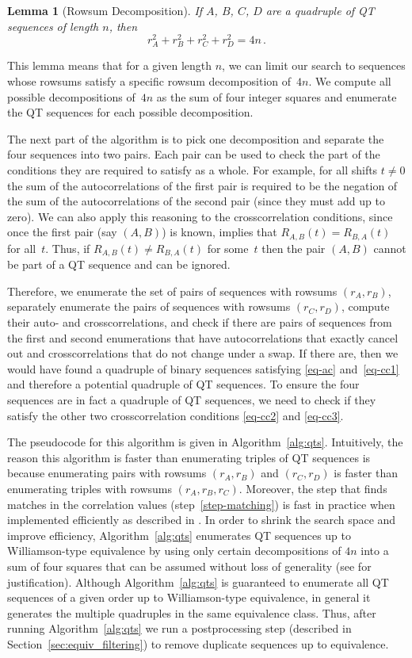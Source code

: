 \documentclass[12pt]{article}
\numberwithin{equation}{section}
\newtheorem{lemma}[theorem]{Lemma}
\begin{document}
\begin{lemma}[Rowsum Decomposition]
If $A$, $B$, $C$, $D$ are a quadruple of QT sequences of length $n$, then
\[ r_A^2 + r_B^2+r_C^2+r_D^2 = 4n \, . \]
\end{lemma}

This lemma means that for a given length $n$, we can limit our search to sequences whose rowsums satisfy
a specific rowsum decomposition of~$4n$.
We compute all possible decompositions of~$4n$ as the sum of
four integer squares and enumerate the QT sequences for each possible decomposition.

The next part of the algorithm is to pick one decomposition and separate the four sequences into two pairs.
Each pair can be used to check the part of the conditions they are required to satisfy as a whole.
For example, for all shifts $t\neq0$ the sum of the autocorrelations of the first pair is required to be the negation of the sum of the autocorrelations of the second pair (since they must add up to zero).
We can also apply this reasoning to the crosscorrelation conditions,
since once the first pair (say $(A,B)$) is known,  implies
that $R_{A,B}(t)=R_{B,A}(t)$ for all~$t$.  Thus, if $R_{A,B}(t)\neq R_{B,A}(t)$ for some~$t$
then the pair $(A,B)$ cannot be part of a QT sequence and can be ignored.

Therefore, we enumerate the set of pairs of sequences
with rowsums $(r_A,r_B)$, separately enumerate the pairs of sequences with rowsums $(r_C,r_D)$, compute their auto- and crosscorrelations,
and check if there are pairs of sequences from the first and second enumerations that
have autocorrelations that exactly cancel out and crosscorrelations that do not change under a swap.
If there are, then we would have found a quadruple of binary sequences satisfying
\eqref{eq-ac} and~\eqref{eq-cc1} and therefore a potential quadruple of QT sequences.
To ensure the four sequences are in fact a quadruple of QT sequences, we need to check if they satisfy the other two crosscorrelation conditions
\eqref{eq-cc2} and \eqref{eq-cc3}.

The pseudocode for this algorithm is given in Algorithm~\ref{alg:qts}.  Intuitively,
the reason this algorithm is faster than enumerating triples of QT sequences
is because enumerating pairs with rowsums $(r_A,r_B)$ and $(r_C,r_D)$ is faster than
enumerating triples with rowsums $(r_A,r_B,r_C)$.  Moreover,
the step that finds matches in the correlation values (step~\ref{step-matching}) is fast in practice
when implemented efficiently as described in .
In order to shrink the search space and improve efficiency,
Algorithm~\ref{alg:qts} enumerates QT sequences up to Williamson-type equivalence
by using only certain decompositions of $4n$ into a sum of four squares that
can be assumed without loss of generality (see  for justification).
Although Algorithm~\ref{alg:qts} is guaranteed to enumerate
all QT sequences of a given order up to Williamson-type equivalence, in general it generates the
multiple quadruples in the same equivalence class.  Thus, after running Algorithm~\ref{alg:qts}
we run a postprocessing step (described in Section~\ref{sec:equiv_filtering})
to remove duplicate sequences up to equivalence.
\end{document}
